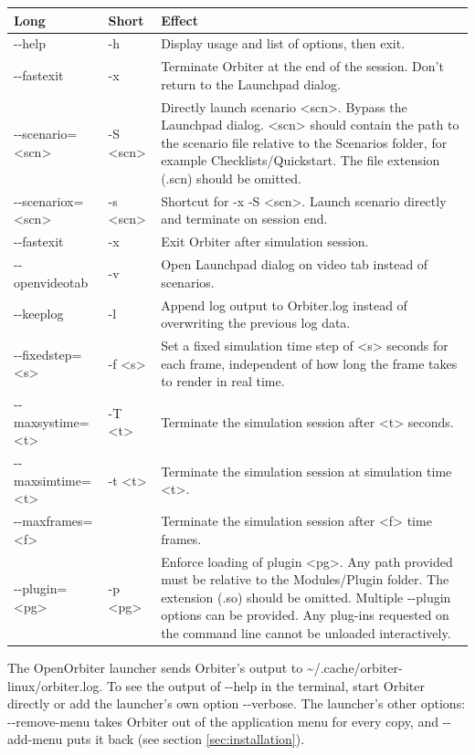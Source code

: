 \documentclass[Orbiter User Manual.tex]{subfiles}
\begin{document}
	\begin{longtable}{ |p{}|p{}|p{}| }
	\hline\rule{0pt}{2ex}
	\textbf{Long} & \textbf{Short} & \textbf{Effect}\\
	\hline\rule{0pt}{2ex}
	-{}-help & -h & Display usage and list of options, then exit.\\
	\hline\rule{0pt}{2ex}
	-{}-fastexit & -x & Terminate Orbiter at the end of the session. Don't return to the Launchpad dialog.\\
	\hline\rule{0pt}{2ex}
	-{}-scenario=<scn> & -S <scn> & Directly launch scenario <scn>. Bypass the Launchpad dialog. <scn> should contain the path to the scenario file relative to the Scenarios folder, for example Checklists/Quickstart. The file extension (.scn) should be omitted.\\
	\hline\rule{0pt}{2ex}
	-{}-scenariox=<scn> & -s <scn> & Shortcut for -x -S <scn>. Launch scenario directly and terminate on session end.\\
	\hline\rule{0pt}{2ex}
	-{}-fastexit & -x & Exit Orbiter after simulation session.\\
	\hline\rule{0pt}{2ex}
	-{}-openvideotab & -v & Open Launchpad dialog on video tab instead of scenarios.\\
	\hline\rule{0pt}{2ex}
	-{}-keeplog & -l & Append log output to Orbiter.log instead of overwriting the previous log data.\\
	\hline\rule{0pt}{2ex}
	-{}-fixedstep=<s> & -f <s> & Set a fixed simulation time step of <s> seconds for each frame, independent of how long the frame takes to render in real time.\\
	\hline\rule{0pt}{2ex}
	-{}-maxsystime=<t> & -T <t> & Terminate the simulation session after <t> seconds.\\
	\hline\rule{0pt}{2ex}
	-{}-maxsimtime=<t> & -t <t> & Terminate the simulation session at simulation time <t>.\\
	\hline\rule{0pt}{2ex}
	-{}-maxframes=<f> & & Terminate the simulation session after <f> time frames.\\
	\hline\rule{0pt}{2ex}
	-{}-plugin=<pg> & -p <pg> & Enforce loading of plugin <pg>. Any path provided must be relative to the Modules/Plugin folder. The extension (.so) should be omitted. Multiple -{}-plugin options can be provided. Any plug-ins requested on the command line cannot be unloaded interactively.\\
	\hline
	\end{longtable}

\noindent
The OpenOrbiter launcher sends Orbiter's output to \textasciitilde/.cache/orbiter-linux/orbiter.log. To see the output of -{}-help in the terminal, start Orbiter directly or add the launcher's own option -{}-verbose. The launcher's other options: -{}-remove-menu takes Orbiter out of the application menu for every copy, and -{}-add-menu puts it back (see section \ref{sec:installation}).
\end{document}

